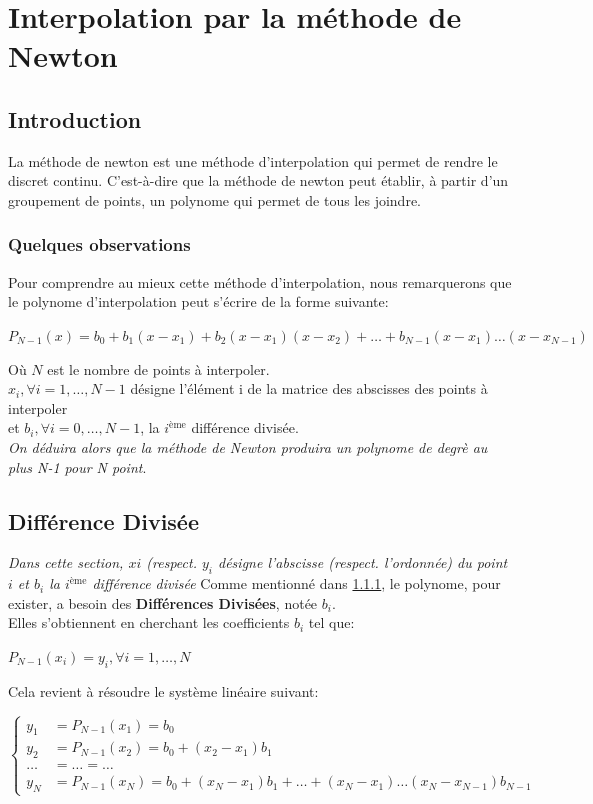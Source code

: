 \section{Interpolation par la méthode de Newton}
\subsection{Introduction}
La méthode de newton est une méthode d'interpolation qui permet de rendre le discret continu. C'est-à-dire que la méthode de newton peut établir, à partir d'un groupement de points, un polynome qui permet de tous les joindre. \\
\subsubsection{Quelques observations} \label{obs}
Pour comprendre au mieux cette méthode d'interpolation, nous remarquerons que le polynome d'interpolation peut s'écrire de la forme suivante:\\
\begin{center}
$P_{N-1}(x) = b_0 + b_1 (x-x_1) + b_2(x-x_1)(x-x_2)+ \ldots+b_{N-1}(x-x_1)\ldots(x-x_{N-1})$
\end{center}
Où $N$ est le nombre de points à interpoler. \\
$x_i, \forall i = 1,\ldots,N-1$ désigne l'élément i de la matrice des abscisses des points à interpoler  \\
et $b_i, \forall i=0,\ldots, N-1$, la $i^{\text{ème}}$ différence divisée. \\
\textit{On déduira alors que la méthode de Newton produira un polynome de degrè au plus N-1 pour N point}.\\


\subsection{Différence Divisée}
\textit{Dans cette section, $xi$ (respect. $y_i$ désigne l'abscisse (respect. l'ordonnée) du point $i$ et $b_i$ la $i^{\text{ème}}$ différence divisée}
Comme mentionné dans \ref{obs}, le polynome, pour exister, a besoin des \textbf{Différences Divisées}, notée \textit{$b_i$}.\\
Elles s'obtiennent en cherchant les coefficients $b_i$ tel que:
\begin{center}
$P_{N-1}(x_i) = y_i, \forall i=1,\ldots,N$
\end{center}
Cela revient à résoudre le système linéaire suivant:
\begin{center}
$
\begin{cases}
y_1 & = P_{N-1}(x_1) = b_0 \\
y_2 & = P_{N-1}(x_2) = b_0 + (x_2 - x_1) b_1 \\
\ldots&= \ldots  = \ldots \\
y_N &= P_{N-1}(x_N)= b_0 + (x_N - x_1)b_1+\ldots+(x_N-x_1)\ldots(x_N-x_{N-1})b_{N-1}
\end{cases}
$
\end{center}
